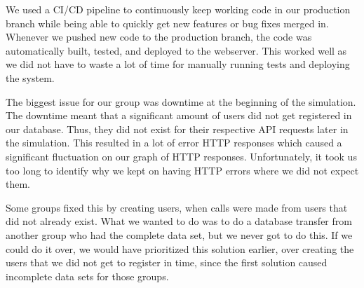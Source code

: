 We used a CI/CD pipeline to continuously keep working code in our production branch while being able to quickly get new features or bug fixes merged in. Whenever we pushed new code to the production branch, the code was automatically built, tested, and deployed to the webserver. This worked well as we did not have to waste a lot of time for manually running tests and deploying the system.


The biggest issue for our group was downtime at the beginning of the simulation. The downtime meant that a significant amount of users did not get registered in our database. Thus, they did not exist for their respective API requests later in the simulation. This resulted in a lot of error HTTP responses which caused a significant fluctuation on our graph of HTTP responses. Unfortunately, it took us too long to identify why we kept on having HTTP errors where we did not expect them.


Some groups fixed this by creating users, when calls were made from users that did not already exist. 
What we wanted to do was to do a database transfer from another group who had the complete data set, but we never got to do this. If we could do it over, we would have prioritized this solution earlier, over creating the users that we did not get to register in time, since the first solution caused incomplete data sets for those groups. 
